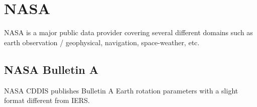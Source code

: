 \documentclass[dec_sum_main.tex]{subfiles}
\begin{document}
\pagebreak

\section{NASA}
NASA is a major public data provider covering several different domains such as earth observation / geophysical, navigation, space-weather, etc.\newline  

\subsection{NASA Bulletin A}
NASA CDDIS publishes Bulletin A Earth rotation parameters with a slight format different from IERS.\newline

 \newline
\end{document}
